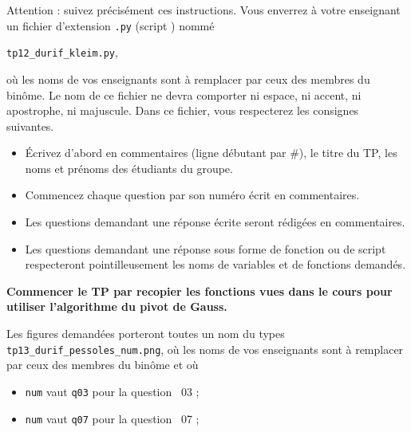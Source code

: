 Attention : suivez précisément ces instructions. Vous enverrez à votre enseignant un fichier d'extension  \texttt{.py} (script \python) nommé
\begin{center}
  \texttt{tp12\_durif\_kleim.py},
\end{center}
où les noms de vos enseignants sont à remplacer par ceux des membres du binôme. Le nom de ce 
fichier ne devra comporter ni espace, ni accent, ni apostrophe, ni majuscule.
Dans ce fichier, vous respecterez les consignes suivantes.
\begin{itemize}
  \item \'Ecrivez d'abord en commentaires (ligne débutant par \#), le titre du TP, les noms et prénoms des étudiants du groupe.
  \item Commencez chaque question par son numéro écrit en commentaires.
  \item Les questions demandant une réponse écrite seront rédigées en commentaires.
  \item Les questions demandant une réponse sous forme de fonction ou de script respecteront pointilleusement les noms de variables et de fonctions demandés.
\end{itemize} 

\textbf{Commencer le TP par recopier les fonctions vues dans le cours pour utiliser l'algorithme du pivot de Gauss.}

Les figures demandées porteront toutes un nom du types \texttt{tp13\_durif\_pessoles\_num.png}, où les noms de vos enseignants sont à remplacer par ceux des membres du binôme et où
\begin{itemize}
  \item \texttt{num} vaut \texttt{q03} pour la question~ 03 ;
   \item \texttt{num} vaut \texttt{q07} pour la question~ 07 ;
\end{itemize}